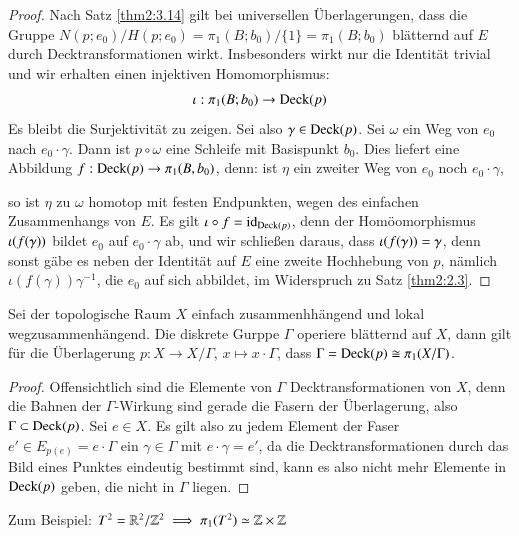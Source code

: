 \documentclass[a4paper,10pt]{scrartcl}
\begin{document}
\begin{proof}
 Nach Satz \ref{thm2:3.14} gilt bei universellen Überlagerungen, dass die Gruppe $N(p; e_0)/H(p;e_0)=\pi_1(B;b_0)/\{1\}=\pi_1(B;b_0)$ blätternd auf $E$ durch Decktransformationen wirkt. Insbesonders wirkt nur die Identität trivial und wir erhalten einen injektiven Homomorphismus:
\[
 \iota: \pi_1(B;b_0)\to \operatorname{Deck}(p)
\]
Es bleibt die Surjektivität zu zeigen.  Sei also $\gamma\in \operatorname{Deck}(p)$. Sei $\omega$ ein Weg von $e_0$ nach $e_0\cdot \gamma$. Dann ist $p\circ \omega$ eine Schleife mit Basispunkt $b_0$. Dies liefert eine Abbildung $f: \operatorname{Deck}(p)\to \pi_1(B,b_0)$, denn: ist $\eta$ ein zweiter Weg von $e_0$ noch $e_0 \cdot \gamma$,
\begin{figure}[H]
\centering
 \fixme[fig97]
\caption{}
\end{figure}
so ist $\eta$ zu $\omega$ homotop mit festen Endpunkten, wegen des einfachen Zusammenhangs von $E$. Es gilt $\iota\circ f = \operatorname{id}_{\operatorname{Deck}(p)}$, denn der Homöomorphismus $\iota(f(\gamma))$ bildet $e_0$ auf $e_0\cdot \gamma$ ab, und wir schließen daraus, dass $\iota(f(\gamma))=\gamma$, denn sonst gäbe es neben der Identität auf $E$ eine zweite Hochhebung von $p$, nämlich $\iota(f(\gamma))\gamma^{-1}$, die $e_0$ auf sich abbildet, im Widerspruch zu Satz \ref{thm2:2.3}.
\end{proof}
\begin{kor}
 Sei der topologische Raum $X$ einfach zusammenhhängend und lokal wegzusammenhängend. Die diskrete Gurppe $\Gamma$ operiere blätternd auf $X$, dann gilt für die Überlagerung $p: X\to X/\Gamma$, $x\mapsto x \cdot \Gamma$, dass $\Gamma=\operatorname{Deck}(p)\cong\pi_1(X/\Gamma)$.
\end{kor}
\begin{proof}
 Offensichtlich sind die Elemente von $\Gamma$ Decktransformationen von $X$, denn die Bahnen der $\Gamma$-Wirkung sind gerade die Fasern der Überlagerung, also $\Gamma\subset \operatorname{Deck}(p)$. Sei $e\in X$. Es gilt also zu jedem Element der Faser $e'\in E_{p(e)}=e\cdot \Gamma$ ein $\gamma \in \Gamma$ mit $e\cdot \gamma=e'$, da die Decktransformationen durch das Bild eines Punktes eindeutig bestimmt sind, kann es also nicht mehr Elemente in $\operatorname{Deck}(p)$ geben, die nicht in $\Gamma$ liegen. 
\end{proof}
\begin{note*}
 Zum Beispiel: $T^2 = \mathbb{R}^2 / \mathbb{Z}^2 \implies \pi_1(T^2) \simeq \mathbb{Z} \times \mathbb{Z}$
\end{note*}
\end{document}
